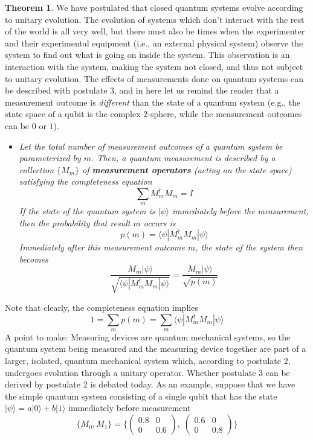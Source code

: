 \documentclass{article}
\theoremstyle{definition}
\newtheorem{theorem}{Theorem}[section]
\begin{document}
\begin{theorem}
We have postulated that closed quantum systems evolve according to unitary evolution. The evolution of systems which don't interact with the rest of the world is all very well, but there must also be times when the experimenter and their experimental equipment (i.e., an external physical system) observe the system to find out what is going on inside the system. This observation is an interaction with the system, making the system not closed, and thus not subject to unitary evolution. The effects of measurements done on quantum systems can be described with postulate 3, and in here let us remind the reader that a measurement outcome is \textit{different} than the state of a quantum system (e.g., the state space of a qubit is the complex $2$-sphere, while the measurement outcomes can be $0$ or $1$).
\begin{itemize}
    \item \textit{Let the total number of measurement outcomes of a quantum system be parameterized by $m$. Then, a quantum measurement is described by a collection $\{M_m\}$ of \textbf{measurement operators} (acting on the state space) satisfying the \textit{completeness equation}}
      \[\sum_{m} M_m^\dagger M_m = I\]
    \textit{If the state of the quantum system is $|\psi \rangle$ immediately before the measurement, then the probability that result $m$ occurs is}
      \[p(m) = \langle \psi | M_m^\dagger M_m | \psi \rangle\]
    \textit{Immediately after this measurement outcome $m$, the state of the system then becomes}
      \[\frac{M_m |\psi \rangle}{\sqrt{\langle \psi| M_m^\dagger M_m |\psi \rangle}} = \frac{M_m |\psi \rangle}{\sqrt{p(m)}}\]
\end{itemize}
Note that clearly, the completeness equation implies
  \[1 = \sum_m p(m) = \sum_m \langle \psi | M_m^\dagger M_m | \psi \rangle\]
A point to make: Measuring devices are quantum mechanical systems, so the quantum system being measured and the measuring device together are part of a larger, isolated, quantum mechanical system which, according to postulate 2, undergoes evolution through a unitary operator. Whether postulate 3 can be derived by postulate 2 is debated today.
As an example, suppose that we have the simple quantum system consisting of a single qubit that has the state $|\psi \rangle = a|0\rangle + b|1 \rangle$ immediately before measurement
\[\{M_0, M_1\} = \bigg\{ \begin{pmatrix} 0.8 & 0 \\  0 & 0.6 \end{pmatrix}, \; \begin{pmatrix} 0.6&0\\0&0.8 \end{pmatrix} \bigg\}\]

\end{theorem}
\end{document}
